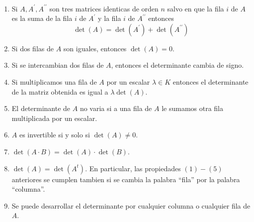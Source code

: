 \begin{proposition}
	~\\
	\begin{enumerate}
		\item Si \(A, A^\prime, A^{\prime\prime}\) son tres matrices identicas de orden \(n \) salvo en que la fila \(i \) de \(A \) es la suma de la fila \(i \) de \(A^\prime\) y la fila \(i \) de \(A^{\prime\prime}  \) entonces
		      \[
			      \det(A) = \det(A^\prime) + \det(A^{\prime\prime} )
		      \]
		\item Si dos filas de \(A \) son iguales, entonces \(\det(A) = 0 \).
		\item Si se intercambian dos filas de \(A \), entonces el determinante cambia de signo.
		\item Si multiplicamos una fila de \(A \) por un escalar \(\lambda \in K \) entonces el determinante de la matriz obtenida es igual a \(\lambda \det(A)\).
		\item El determinante de \(A \) no varia si a una fila de \(A \) le sumamos otra fila multiplicada por un escalar.
		\item \(A \) es invertible si y solo si \(\det(A) \neq  0 \).
		\item \(\det(A \cdot B) = \det(A) \cdot \det(B )\).
		\item \(\det(A) = \det(A^{t} )\). En particular, las propiedades \((1)-(5)\) anteriores se cumplen tambien si se cambia la palabra ``fila'' por la palabra ``columna''.
		\item Se puede desarrollar el determinante por cualquier columna o cualquier fila de \(A\).
	\end{enumerate}
\end{proposition}
